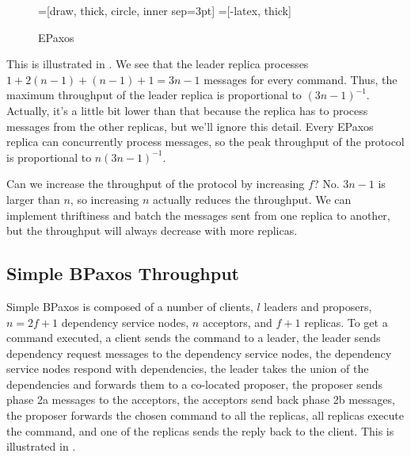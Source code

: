 \begin{figure}[ht]
  \centering
  =[draw, thick, circle, inner sep=3pt]
  =[-latex, thick]
  \caption{EPaxos}
\end{figure}


This is illustrated in . We see that the leader replica
processes $1 + 2(n-1) + (n-1) + 1 = 3n - 1$ messages for every command. Thus,
the maximum throughput of the leader replica is proportional to $(3n -
1)^{-1}$. Actually, it's a little bit lower than that because the replica has
to process messages from the other replicas, but we'll ignore this detail.
Every EPaxos replica can concurrently process messages, so the peak throughput
of the protocol is proportional to $n(3n-1)^{-1}$.

Can we increase the throughput of the protocol by increasing $f$? No. $3n - 1$
is larger than $n$, so increasing $n$ actually reduces the throughput. We can
implement thriftiness and batch the messages sent from one replica to another,
but the throughput will always decrease with more replicas.

\subsection{Simple BPaxos Throughput}
Simple BPaxos is composed of a number of clients, $l$ leaders and proposers, $n
= 2f+1$ dependency service nodes, $n$ acceptors, and $f + 1$ replicas. To get a
command executed, a client sends the command to a leader, the leader sends
dependency request messages to the dependency service nodes, the dependency
service nodes respond with dependencies, the leader takes the union of the
dependencies and forwards them to a co-located proposer, the proposer sends
phase 2a messages to the acceptors, the acceptors send back phase 2b messages,
the proposer forwards the chosen command to all the replicas, all replicas
execute the command, and one of the replicas sends the reply back to the
client. This is illustrated in .

